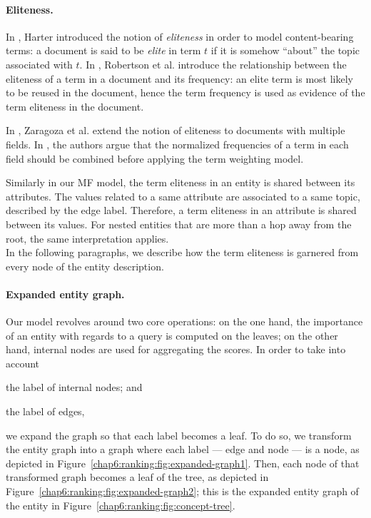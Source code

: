 \paragraph{Eliteness.}

In \cite{harter:1974:thesis}, Harter introduced the notion of \emph{eliteness} in order to model content-bearing terms: a document is said to be \emph{elite} in term $t$ if it is somehow ``about'' the topic associated with $t$. In \cite{robertson:1981:PMI}, Robertson et al. introduce the relationship between the eliteness of a term in a document and its frequency: an elite term is most likely to be reused in the document, hence the term frequency is used as evidence of the term eliteness in the document.

In \cite{zaragoza:2004:microsoft}, Zaragoza et al. extend the notion of eliteness to documents with multiple fields. In \cite{robertson:2004:cikm}, the authors argue that the normalized frequencies of a term in each field should be combined before applying the term weighting model.

Similarly in our \gls{MF} model, the term eliteness in an entity is shared between its attributes. The values related to a same attribute are associated to a same topic, described by the edge label. Therefore, a term eliteness in an attribute is shared between its values. For nested entities that are more than a hop away from the root, the same interpretation applies.\\

In the following paragraphs, we describe how the term eliteness is garnered from every node of the entity description.

\paragraph{Expanded entity graph.}

Our model revolves around two core operations: on the one hand, the importance of an entity with regards to a query is computed on the leaves; on the other hand, internal nodes are used for aggregating the scores. In order to take into account
\begin{inparaenum}[(a)]
	\item the label of internal nodes; and
	\item the label of edges,
\end{inparaenum}
we expand the graph so that each label becomes a leaf. To do so, we transform the entity graph into a graph where each label --- edge and node --- is a node, as depicted in Figure~\ref{chap6:ranking:fig:expanded-graph1}. Then, each node of that transformed graph becomes a leaf of the tree, as depicted in Figure~\ref{chap6:ranking:fig:expanded-graph2}; this is the expanded entity graph of the entity in Figure~\ref{chap6:ranking:fig:concept-tree}.

